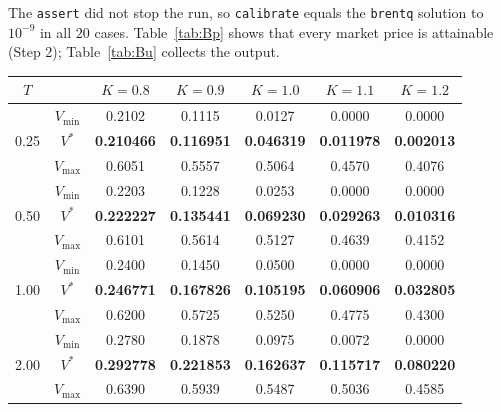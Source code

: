 \documentclass[11pt,a4paper]{article}
\begin{document}
\noindent The \texttt{assert} did not stop the run, so \texttt{calibrate} equals the \texttt{brentq} solution to $10^{-9}$ in all $20$ cases. Table~\ref{tab:Bp} shows that every market price is attainable (Step 2); Table~\ref{tab:Bu} collects the output.

\begin{center}
\small
\begin{tabular}{cc*{5}{c}}
\toprule
$T$ & & $K=0.8$ & $K=0.9$ & $K=1.0$ & $K=1.1$ & $K=1.2$\\
\midrule
\multirow{3}{*}{0.25} & $V_{\min}$ & 0.2102 & 0.1115 & 0.0127 & 0.0000 & 0.0000\\
 & $V^*$ & \textbf{0.210466} & \textbf{0.116951} & \textbf{0.046319} & \textbf{0.011978} & \textbf{0.002013}\\
 & $V_{\max}$ & 0.6051 & 0.5557 & 0.5064 & 0.4570 & 0.4076\\
\midrule
\multirow{3}{*}{0.50} & $V_{\min}$ & 0.2203 & 0.1228 & 0.0253 & 0.0000 & 0.0000\\
 & $V^*$ & \textbf{0.222227} & \textbf{0.135441} & \textbf{0.069230} & \textbf{0.029263} & \textbf{0.010316}\\
 & $V_{\max}$ & 0.6101 & 0.5614 & 0.5127 & 0.4639 & 0.4152\\
\midrule
\multirow{3}{*}{1.00} & $V_{\min}$ & 0.2400 & 0.1450 & 0.0500 & 0.0000 & 0.0000\\
 & $V^*$ & \textbf{0.246771} & \textbf{0.167826} & \textbf{0.105195} & \textbf{0.060906} & \textbf{0.032805}\\
 & $V_{\max}$ & 0.6200 & 0.5725 & 0.5250 & 0.4775 & 0.4300\\
\midrule
\multirow{3}{*}{2.00} & $V_{\min}$ & 0.2780 & 0.1878 & 0.0975 & 0.0072 & 0.0000\\
 & $V^*$ & \textbf{0.292778} & \textbf{0.221853} & \textbf{0.162637} & \textbf{0.115717} & \textbf{0.080220}\\
 & $V_{\max}$ & 0.6390 & 0.5939 & 0.5487 & 0.5036 & 0.4585\\
\bottomrule
\end{tabular}
\label{tab:Bp}
\end{center}
\end{document}
